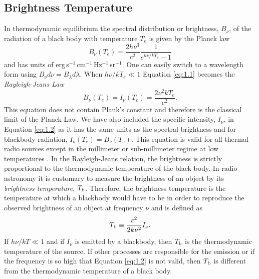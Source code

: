 \subsection{Brightness Temperature}\label{sec:1.8.1}
In thermodynamic equilibrium the spectral distribution or brightness, $B_{\nu}$, of the radiation of a black body with temperature $T_{e}$ is given by the Planck law
\begin{equation}\label{eq:1.1}
B_{\nu}(T_{e})=\frac{2h\nu ^3}{c^2}\frac{1}{e^{h\nu /kT_{e}}-1}
\end{equation}
and has units of erg\,s$^{-1}$\,cm$^{-1}$\,Hz$^{-1}$\,sr$^{-1}$. One can easily switch to a wavelength form using  $B_{\nu}d\nu = B_{\lambda}d\lambda$. When $h\nu /kT_{e} \ll 1$ Equation \ref{eq:1.1} becomes the \textit{Rayleigh-Jeans Law}
\begin{equation}
\label{eq:1.2}
B_{\nu}(T_{e})=I_{\nu}(T_{e})=\dfrac{2\nu ^2kT_{e}}{c^2}.
\end{equation}
This equation does not contain Plank's constant and therefore is the classical limit of the Planck Law. We have also included the specific intensity, $I_{\nu}$, in Equation \ref{eq:1.2} as it has the same units as the spectral brightness and for blackbody radiation, $I_{\nu}(T_{e}) = B_{\nu}(T_{e})$. This equation is valid for all thermal radio sources except in the millimeter or sub-millimeter regime at low temperatures \citep{rohlfs_1996}. In the Rayleigh-Jeans relation, the brightness is strictly proportional to the thermodynamic temperature of the black body. In radio astronomy it is customary to measure the brightness of an object by its \textit{brightness temperature}, $T_{\rm{b}}$. Therefore, the brightness temperature is the temperature at which a blackbody would have to be in order to reproduce the observed brightness of an object at frequency $\nu$ and is defined as
\begin{equation}\label{eq:1.3}
T_{\rm{b}}\equiv \frac{c^2}{2k\nu ^2}I_{\nu}. 
\end{equation}
If $h\nu /kT \ll 1$ and if $I_{\nu}$ is emitted by a blackbody, then $T_{\rm{b}}$ is the thermodynamic temperature of the source. If other processes are responsible for the emission or if the frequency is so high that Equation \ref{eq:1.2} is not valid, then $T_{\rm{b}}$ is different from the thermodynamic temperature of a black body.

